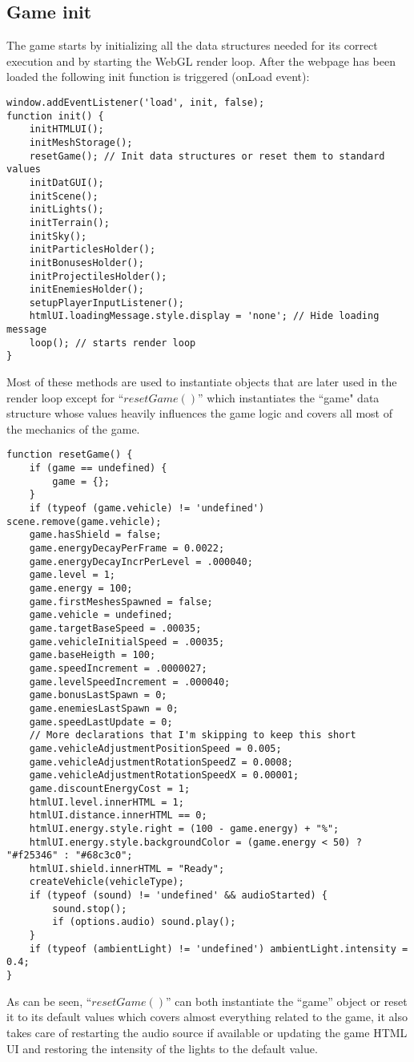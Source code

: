 \documentclass[a4paper,11pt]{article}
\begin{document}
\subsection{Game init}
The game starts by initializing all the data structures needed for its correct execution and by starting the WebGL render loop.
After the webpage has been loaded the following init function is triggered (onLoad event):
\begin{verbatim}
window.addEventListener('load', init, false);
function init() {
    initHTMLUI();
    initMeshStorage();
    resetGame(); // Init data structures or reset them to standard values
    initDatGUI();
    initScene();
    initLights();
    initTerrain();
    initSky();
    initParticlesHolder();
    initBonusesHolder();
    initProjectilesHolder();
    initEnemiesHolder();
    setupPlayerInputListener();
    htmlUI.loadingMessage.style.display = 'none'; // Hide loading message
    loop(); // starts render loop
}

\end{verbatim}
Most of these methods are used to instantiate objects that are later used in the render loop except for ``$resetGame()$'' which instantiates the ``game" data structure whose values heavily influences the game logic and covers all most of the mechanics of the game.

\begin{verbatim}
function resetGame() {
    if (game == undefined) {
        game = {};
    }
    if (typeof (game.vehicle) != 'undefined') scene.remove(game.vehicle);
    game.hasShield = false;
    game.energyDecayPerFrame = 0.0022;
    game.energyDecayIncrPerLevel = .000040;
    game.level = 1;
    game.energy = 100;
    game.firstMeshesSpawned = false;
    game.vehicle = undefined;
    game.targetBaseSpeed = .00035;
    game.vehicleInitialSpeed = .00035;
    game.baseHeigth = 100;
    game.speedIncrement = .0000027;
    game.levelSpeedIncrement = .000040;
    game.bonusLastSpawn = 0;
    game.enemiesLastSpawn = 0;
    game.speedLastUpdate = 0;
    // More declarations that I'm skipping to keep this short
    game.vehicleAdjustmentPositionSpeed = 0.005;
    game.vehicleAdjustmentRotationSpeedZ = 0.0008;
    game.vehicleAdjustmentRotationSpeedX = 0.00001;
    game.discountEnergyCost = 1;
    htmlUI.level.innerHTML = 1;
    htmlUI.distance.innerHTML == 0;
    htmlUI.energy.style.right = (100 - game.energy) + "%";
    htmlUI.energy.style.backgroundColor = (game.energy < 50) ? "#f25346" : "#68c3c0";
    htmlUI.shield.innerHTML = "Ready";
    createVehicle(vehicleType);
    if (typeof (sound) != 'undefined' && audioStarted) {
        sound.stop();
        if (options.audio) sound.play();
    }
    if (typeof (ambientLight) != 'undefined') ambientLight.intensity = 0.4;
}
\end{verbatim}
As can be seen, ``$resetGame()$'' can both instantiate the ``game'' object or reset it to its default values which covers almost everything related to the game, it also takes care of restarting the audio source if available or updating the game HTML UI and restoring the intensity of the lights to the default value.
\end{document}
